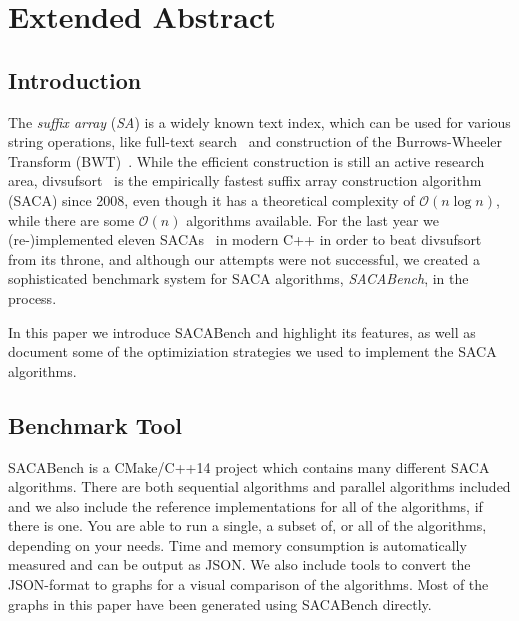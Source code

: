\chapter{Extended Abstract}


\section{Introduction}

The  \emph{suffix array} (\emph{SA}) is a widely known text index,
which can be used for various string operations,
like full-text search~\cite{makinen} and construction of the Burrows-Wheeler Transform (BWT)~\cite{BWT}.
While the efficient construction is still an active research area,
divsufsort~\cite{saca:5,saca:5:repo} is the empirically fastest suffix array construction algorithm (SACA) since 2008,
even though it has a theoretical complexity of $\mathcal O (n \log n)$,
while there are some $\mathcal O(n)$ algorithms available.
For the last year we (re-)implemented eleven SACAs~\cite{saca:3,saca:11,saca:5,saca:9,saca:1,saca:8,saca:4,saca:7,saca:10,saca:6,saca:2} in modern C++ in order to beat divsufsort from its throne,
and although our attempts were not successful,
we created a sophisticated benchmark system for SACA algorithms, \emph{SACABench}, in the process.

In this paper we introduce SACABench and highlight its features,
as well as document some of the optimiziation strategies we used to implement the SACA algorithms. \blindtext

\section{Benchmark Tool}

SACABench is a CMake/C++14 project which contains many different SACA algorithms.
There are both sequential algorithms and parallel algorithms included and we also include the reference implementations for all of the algorithms, if there is one.
You are able to run a single, a subset of, or all of the algorithms, depending on your needs.
Time and memory consumption is automatically measured and can be output as JSON.
We also include tools to convert the JSON-format to graphs for a visual comparison of the algorithms.
Most of the graphs in this paper have been generated using SACABench directly.


